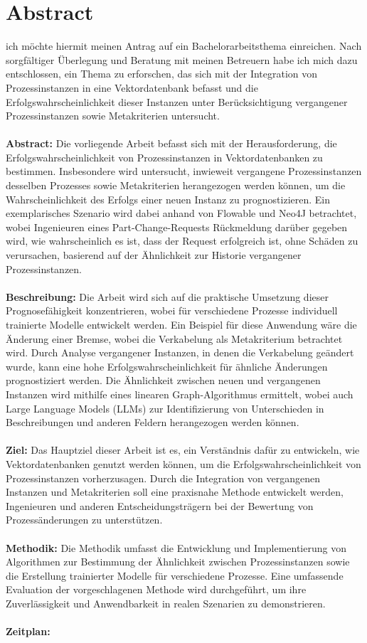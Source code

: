 \documentclass[11pt]{article}
\begin{document}
    \section{Abstract}
    ich möchte hiermit meinen Antrag auf ein Bachelorarbeitsthema einreichen. Nach sorgfältiger Überlegung und Beratung mit meinen Betreuern habe ich mich dazu entschlossen, ein Thema zu erforschen, das sich mit der Integration von Prozessinstanzen in eine Vektordatenbank befasst und die Erfolgswahrscheinlichkeit dieser Instanzen unter Berücksichtigung vergangener Prozessinstanzen sowie Metakriterien untersucht.
    \\\\
    \textbf{Abstract:}
    Die vorliegende Arbeit befasst sich mit der Herausforderung, die Erfolgswahrscheinlichkeit von Prozessinstanzen in Vektordatenbanken zu bestimmen. Insbesondere wird untersucht, inwieweit vergangene Prozessinstanzen desselben Prozesses sowie Metakriterien herangezogen werden können, um die Wahrscheinlichkeit des Erfolgs einer neuen Instanz zu prognostizieren. Ein exemplarisches Szenario wird dabei anhand von Flowable und Neo4J betrachtet, wobei Ingenieuren eines Part-Change-Requests Rückmeldung darüber gegeben wird, wie wahrscheinlich es ist, dass der Request erfolgreich ist, ohne Schäden zu verursachen, basierend auf der Ähnlichkeit zur Historie vergangener Prozessinstanzen.
    \\\\
    \textbf{Beschreibung:}
    Die Arbeit wird sich auf die praktische Umsetzung dieser Prognosefähigkeit konzentrieren, wobei für verschiedene Prozesse individuell trainierte Modelle entwickelt werden. Ein Beispiel für diese Anwendung wäre die Änderung einer Bremse, wobei die Verkabelung als Metakriterium betrachtet wird. Durch Analyse vergangener Instanzen, in denen die Verkabelung geändert wurde, kann eine hohe Erfolgswahrscheinlichkeit für ähnliche Änderungen prognostiziert werden. Die Ähnlichkeit zwischen neuen und vergangenen Instanzen wird mithilfe eines linearen Graph-Algorithmus ermittelt, wobei auch Large Language Models (LLMs) zur Identifizierung von Unterschieden in Beschreibungen und anderen Feldern herangezogen werden können.
    \\\\
    \textbf{Ziel:}
    Das Hauptziel dieser Arbeit ist es, ein Verständnis dafür zu entwickeln, wie Vektordatenbanken genutzt werden können, um die Erfolgswahrscheinlichkeit von Prozessinstanzen vorherzusagen. Durch die Integration von vergangenen Instanzen und Metakriterien soll eine praxisnahe Methode entwickelt werden, Ingenieuren und anderen Entscheidungsträgern bei der Bewertung von Prozessänderungen zu unterstützen.
    \\\\
    \textbf{Methodik:}
    Die Methodik umfasst die Entwicklung und Implementierung von Algorithmen zur Bestimmung der Ähnlichkeit zwischen Prozessinstanzen sowie die Erstellung trainierter Modelle für verschiedene Prozesse. Eine umfassende Evaluation der vorgeschlagenen Methode wird durchgeführt, um ihre Zuverlässigkeit und Anwendbarkeit in realen Szenarien zu demonstrieren.
    \\\\
    \textbf{Zeitplan:}
\end{document}
